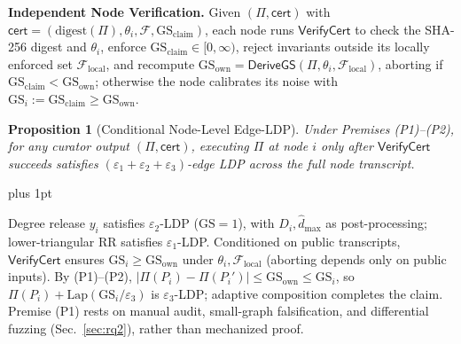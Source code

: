 \documentclass[conference]{IEEEtran}
\makeatletter
\newlength{\ieeeindent}
\newcommand{\parhead}[1]{\par\noindent\hspace*{\ieeeindent}\textbf{#1}}
\theoremstyle{ieeeitalic}
\newtheorem{proposition}{Proposition}
\renewenvironment{proof}[1][\proofname]{\par
  \pushQED{\qed}%
  \normalfont\topsep1.5pt plus 1pt\relax
  \trivlist
  \item[\hskip\labelsep\hspace*{\ieeeindent}\itshape #1:]\ignorespaces
}{%
  \popQED\endtrivlist\@endpefalse
}
\newcommand{\GS}{\mathrm{GS}}
\newcommand{\dhatmax}{\hat{d}_{\max}}
\newcommand{\Lap}{\mathrm{Lap}}
\newcommand{\DeriveGS}{\mathsf{DeriveGS}}
\newcommand{\VerifyCert}{\mathsf{VerifyCert}}
\makeatother
\begin{document}
\parhead{Independent Node Verification.}
Given $(\Pi, \mathsf{cert})$ with $\mathsf{cert} = (\mathrm{digest}(\Pi), \theta_i, \mathcal{F}, \GS_{\mathrm{claim}})$, each node runs $\VerifyCert$ to check the SHA-256 digest and $\theta_i$, enforce $\GS_{\mathrm{claim}} \in [0, \infty)$, reject invariants outside its locally enforced set $\mathcal{F}_{\mathrm{local}}$, and recompute $\GS_{\mathrm{own}} = \DeriveGS(\Pi, \theta_i, \mathcal{F}_{\mathrm{local}})$, aborting if $\GS_{\mathrm{claim}} < \GS_{\mathrm{own}}$; otherwise the node calibrates its noise with $\GS_i := \GS_{\mathrm{claim}} \ge \GS_{\mathrm{own}}$.

\begin{proposition}[Conditional Node-Level Edge-LDP]
\label{prop:privacy}
Under Premises (P1)--(P2), for any curator output $(\Pi, \mathsf{cert})$, executing $\Pi$ at node $i$ only after $\VerifyCert$ succeeds satisfies $(\varepsilon_1+\varepsilon_2+\varepsilon_3)$-edge LDP across the full node transcript.
\end{proposition}
\begin{proof}[Proof Sketch]
Degree release $y_i$ satisfies $\varepsilon_2$-LDP ($\GS=1$), with $D_i, \dhatmax$ as post-processing; lower-triangular RR satisfies $\varepsilon_1$-LDP. Conditioned on public transcripts, $\VerifyCert$ ensures $\GS_i \ge \GS_{\mathrm{own}}$ under $\theta_i, \mathcal{F}_{\mathrm{local}}$ (aborting depends only on public inputs). By (P1)--(P2), $|\Pi(P_i) - \Pi(P_i')| \le \GS_{\mathrm{own}} \le \GS_i$, so $\Pi(P_i) + \Lap(\GS_i/\varepsilon_3)$ is $\varepsilon_3$-LDP; adaptive composition completes the claim.
\end{proof}
Premise (P1) rests on manual audit, small-graph falsification, and differential fuzzing (Sec.~\ref{sec:rq2}), rather than mechanized proof.
\end{document}
